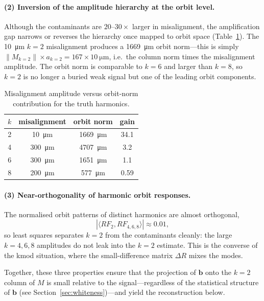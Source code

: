 \documentclass[preprint,12pt]{elsarticle}
\begin{document}
\paragraph{(2) Inversion of the amplitude hierarchy at the orbit level.}
Although the contaminants are $20$--$30\times$ larger in misalignment,
the amplification gap narrows or reverses the hierarchy once mapped to
orbit space (Table~\ref{tab:orbit}). The \SI{10}{\micro\meter} $k=2$
misalignment produces a \SI{1669}{\micro\meter} orbit norm---this is simply
$\|M_{k=2}\|\times a_{k=2}=167\times\SI{10}{\micro\meter}$, i.e.\ the column
norm times the misalignment amplitude. The orbit norm is comparable to $k=6$
and larger than $k=8$, so $k=2$ is no longer a buried weak signal but one
of the leading orbit components.

\begin{table}[t]
\centering
\caption{Misalignment amplitude versus orbit-norm contribution for the
truth harmonics.}
\label{tab:orbit}
\begin{tabular}{cccc}
\toprule
$k$ & misalignment & orbit norm & gain \\
\midrule
2 & \SI{10}{\micro\meter}  & \SI{1669}{\micro\meter} & 34.1 \\
4 & \SI{300}{\micro\meter} & \SI{4707}{\micro\meter} & 3.2 \\
6 & \SI{300}{\micro\meter} & \SI{1651}{\micro\meter} & 1.1 \\
8 & \SI{200}{\micro\meter} & \SI{577}{\micro\meter}  & 0.59 \\
\bottomrule
\end{tabular}
\end{table}

\paragraph{(3) Near-orthogonality of harmonic orbit responses.}
The normalised orbit patterns of distinct harmonics are almost
orthogonal,
\begin{equation}
|\langle RF_2, RF_{4,6,8}\rangle| \approx 0.01,
\end{equation}
so least squares separates $k=2$ from the contaminants cleanly: the large
$k=4,6,8$ amplitudes do not leak into the $k=2$ estimate. This is the
converse of the kmod situation, where the small-difference matrix
$\Delta R$ mixes the modes.

Together, these three properties ensure that the projection of $\mathbf{b}$
onto the $k=2$ column of $M$ is small relative to the signal---regardless
of the statistical structure of $\mathbf{b}$ (see Section~\ref{sec:whiteness})---and yield the reconstruction below.
\end{document}
